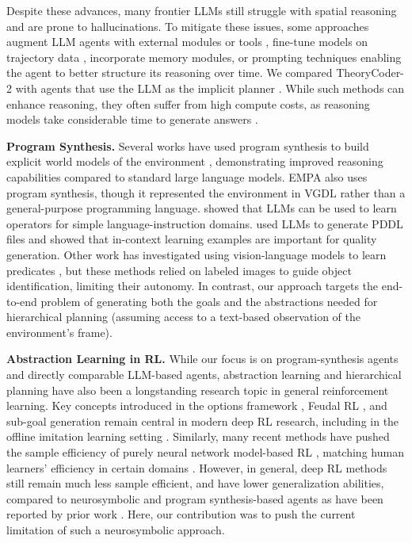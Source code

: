 \documentclass{article}
\theoremstyle{plain}
\theoremstyle{definition}
\theoremstyle{remark}
\begin{document}
Despite these advances, many frontier LLMs still struggle with spatial reasoning and are prone to hallucinations. To mitigate these issues, some approaches augment LLM agents with external modules or tools \citep{cao2025large}, fine-tune models on trajectory data \citep{gaven2024sac}, incorporate memory modules, or prompting techniques  enabling the agent to better structure its reasoning over time. We compared TheoryCoder-2 with agents that use the LLM as the implicit planner \citep{yao2023react, wei2022chain, yao2023tree}. While such methods can enhance reasoning, they often suffer from high compute costs, as reasoning models take considerable time to generate answers \citep{hassid2025don}.

\textbf{Program Synthesis.} Several works have used program synthesis to build explicit world models of the environment \citep{tang2024worldcoder, ahmed2025synthesizing, piriyakulkij2025poe, liu2025interactive}, demonstrating improved reasoning capabilities \citep{gupta2023visual} compared to standard large language models. EMPA \citep{tsividis2021human} also uses program synthesis, though it represented the environment in VGDL rather than a general-purpose programming language. \citet{wong2024learning} showed that LLMs can be used to learn operators for simple language-instruction domains. \citet{liu2023llm+} used LLMs to generate PDDL files and showed that in-context learning examples are important for quality generation. Other work has investigated using vision-language models to learn predicates \citep{liang2025visualpredicator}, but these methods relied on labeled images to guide object identification, limiting their autonomy. In contrast, our approach targets the end-to-end problem of generating both the goals and the abstractions needed for hierarchical planning (assuming access to a text-based observation of the environment's frame). 

\textbf{Abstraction Learning in RL.}
While our focus is on program-synthesis agents and directly comparable LLM-based agents, abstraction learning and hierarchical planning have also been a longstanding research topic in general reinforcement learning. Key concepts introduced in the options framework \citep{sutton1999between,bacon2017option}, Feudal RL \citep{DayanH92,VezhnevetsOSHJS17}, and sub-goal generation \citep{schmidhuber1992subgoalplanning,bakker2004hierarchical} remain central in modern deep RL research, including in the offline imitation learning setting \citep{shiarlis18taco,kipf2019compile,lu2021ompn,gopalakrishnan2023unsupervised}.
Similarly, many recent methods have pushed the sample efficiency of purely neural network model-based RL \citep{schrittwieser2020mastering, hafner2023mastering}, matching human learners' efficiency in certain domains \citep{YeLKAG21}.
However, in general, deep RL methods still remain much less sample efficient, and have lower generalization abilities,
compared to neurosymbolic and program synthesis-based agents as have been reported by prior work \citep{tang2024worldcoder,tsividis2021human}.
Here, our contribution was to push the current limitation of such a neurosymbolic approach.
\end{document}
